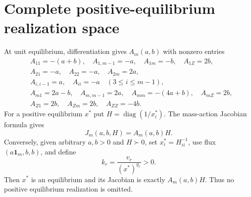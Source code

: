 \section*{Complete positive-equilibrium realization space}
At unit equilibrium, differentiation gives $A_m(a,b)$ with nonzero entries
\begin{align*}
&A_{11}=-(a+b),\quad A_{1,m-1}=-a,\quad A_{1m}=-b,
  \quad A_{1Z}=2b,\\
&A_{21}=-a,\quad A_{22}=-a,\quad A_{2m}=2a,\\
&A_{i,i-1}=a,\quad A_{ii}=-a\quad(3\leq i\leq m-1),\\
&A_{m1}=2a-b,\quad A_{m,m-1}=2a,\quad A_{mm}=-(4a+b),
  \quad A_{mZ}=2b,\\
&A_{Z1}=2b,\quad A_{Zm}=2b,\quad A_{ZZ}=-4b.
\end{align*}
For a positive equilibrium $x^*$ put $H=\operatorname{diag}(1/x_i^*)$.
The mass-action Jacobian formula gives
\[
J_m(a,b,H)=A_m(a,b)H.
\]
Conversely, given arbitrary $a,b>0$ and $H\succ0$, set $x_i^*=H_{ii}^{-1}$,
use flux $(a\mathbf1_m,b,b)$, and define
\[
k_r=\frac{v_r}{(x^*)^{y_r}}>0.
\]
Then $x^*$ is an equilibrium and its Jacobian is exactly $A_m(a,b)H$.
Thus no positive equilibrium realization is omitted.
